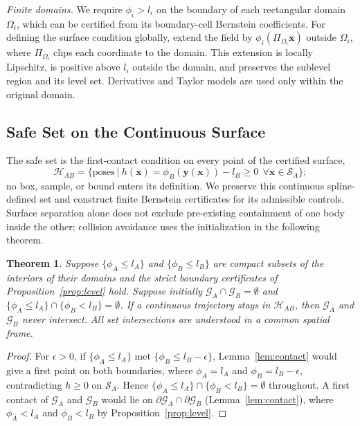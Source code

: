 \documentclass[journal]{IEEEtran}
\newtheorem{theorem}{Theorem}
\theoremstyle{definition}
\begin{document}
\emph{Finite domains.} We require $\phi_i>l_i$ on the boundary of each rectangular domain
$\Omega_i$, which can be certified from its boundary-cell Bernstein coefficients. For defining
the surface condition globally, extend the field by $\phi_i(\Pi_{\Omega_i}\mathbf x)$ outside
$\Omega_i$, where $\Pi_{\Omega_i}$ clips each coordinate to the domain. This extension is locally
Lipschitz, is positive above $l_i$ outside the domain, and preserves the sublevel region and its
level set. Derivatives and Taylor models are used only within the original domain.

\subsection{Safe Set on the Continuous Surface}
The safe set is the first-contact condition on every point of the certified surface,
\begin{equation}\label{eq:safe}
\mathcal H_{AB}=\big\{\text{poses}\ \big|\ h(\mathbf x)=\phi_B(\mathbf y(\mathbf x))-l_B\ge0\ \ \forall\mathbf x\in\mathcal S_A\big\};
\end{equation}
no box, sample, or bound enters its definition. We preserve this continuous spline-defined set
and construct finite Bernstein certificates for its admissible controls. Surface separation alone
does not exclude pre-existing containment of one body inside the other; collision avoidance uses
the initialization in the following theorem.
\begin{theorem}\label{thm:cover}
Suppose $\{\phi_A\le l_A\}$ and $\{\phi_B\le l_B\}$ are compact subsets of the interiors of their domains and
the strict boundary certificates of Proposition~\ref{prop:level} hold. Suppose initially
$\mathcal G_A\cap\mathcal G_B=\emptyset$ and
$\{\phi_A\le l_A\}\cap\{\phi_B<l_B\}=\emptyset$.
If a continuous trajectory stays in $\mathcal H_{AB}$, then $\mathcal G_A$ and $\mathcal G_B$
never intersect. All set intersections are understood in a common spatial frame.
\end{theorem}
\begin{proof}
For $\epsilon>0$, if $\{\phi_A\le l_A\}$ met $\{\phi_B\le l_B-\epsilon\}$, Lemma~\ref{lem:contact} would
give a first point on both boundaries, where $\phi_A=l_A$ and $\phi_B=l_B-\epsilon$, contradicting
$h\ge0$ on $\mathcal S_A$. Hence $\{\phi_A\le l_A\}\cap\{\phi_B<l_B\}=\emptyset$ throughout. A first
contact of $\mathcal G_A$ and $\mathcal G_B$ would lie on $\partial\mathcal G_A\cap\partial\mathcal G_B$
(Lemma~\ref{lem:contact}), where $\phi_A<l_A$ and $\phi_B<l_B$ by Proposition~\ref{prop:level}.
\end{proof}
\end{document}
